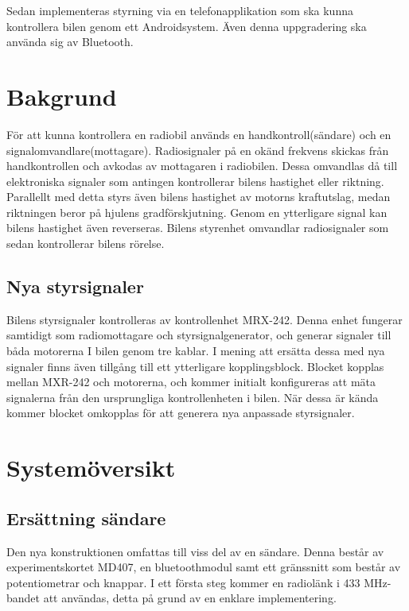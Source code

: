 \documentclass[a4paper]{article}
\begin{document}
Sedan implementeras styrning via en telefonapplikation som ska kunna kontrollera bilen genom ett Androidsystem. Även denna uppgradering ska använda sig av Bluetooth.


\section{Bakgrund}

För att kunna kontrollera en radiobil används en handkontroll(sändare) och en signalomvandlare(mottagare). Radiosignaler på en okänd frekvens skickas från handkontrollen och avkodas av mottagaren i radiobilen. Dessa omvandlas då till elektroniska signaler som antingen kontrollerar bilens hastighet eller riktning. Parallellt med detta styrs även bilens hastighet av motorns kraftutslag, medan riktningen beror på hjulens gradförskjutning. Genom en ytterligare signal kan bilens hastighet även reverseras. Bilens styrenhet omvandlar radiosignaler som sedan kontrollerar bilens rörelse.

\subsection{Nya styrsignaler}
Bilens styrsignaler kontrolleras av kontrollenhet MRX-242. Denna enhet fungerar samtidigt som radiomottagare och styrsignalgenerator, och generar signaler till båda motorerna I bilen genom tre kablar. I mening att ersätta dessa med nya signaler finns även tillgång till ett ytterligare kopplingsblock. Blocket kopplas mellan MXR-242 och motorerna, och kommer initialt konfigureras att mäta signalerna från den ursprungliga kontrollenheten i bilen. När dessa är kända kommer blocket omkopplas för att generera nya anpassade styrsignaler. 

\section{Systemöversikt}
\subsection{Ersättning sändare}
Den nya konstruktionen omfattas till viss del av en sändare. Denna består av experimentskortet MD407, en bluetoothmodul samt ett gränssnitt som består av potentiometrar och knappar. I ett första steg kommer en radiolänk i 433 MHz-bandet att användas, detta på grund av en enklare implementering.
\end{document}

